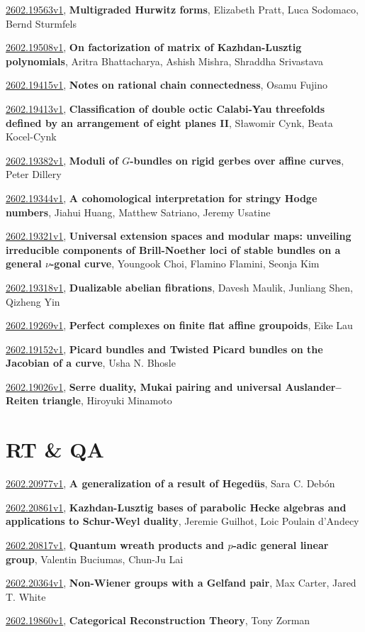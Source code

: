 \documentclass[9pt, a4paper]{article}
\theoremstyle{plain}
\theoremstyle{definition}
\theoremstyle{remark}
\newcommand{\arxiv}[3]{\href{https://arxiv.org/abs/#1}{#1}, \textbf{\textcolor{arxivblue}{#2}}, #3}
\begin{document}
\arxiv{2602.19563v1}{Multigraded Hurwitz forms}{Elizabeth Pratt, Luca Sodomaco, Bernd Sturmfels}

\arxiv{2602.19508v1}{On factorization of matrix of Kazhdan-Lusztig polynomials}{Aritra Bhattacharya, Ashish Mishra, Shraddha Srivastava}

\arxiv{2602.19415v1}{Notes on rational chain connectedness}{Osamu Fujino}

\arxiv{2602.19413v1}{Classification of double octic Calabi-Yau threefolds defined by an arrangement of eight planes II}{Sławomir Cynk, Beata Kocel-Cynk}

\arxiv{2602.19382v1}{Moduli of $G$-bundles on rigid gerbes over affine curves}{Peter Dillery}

\arxiv{2602.19344v1}{A cohomological interpretation for stringy Hodge numbers}{Jiahui Huang, Matthew Satriano, Jeremy Usatine}

\arxiv{2602.19321v1}{Universal extension spaces and modular maps: unveiling irreducible components of Brill-Noether loci of stable bundles on a general $ν$-gonal curve}{Youngook Choi, Flamino Flamini, Seonja Kim}

\arxiv{2602.19318v1}{Dualizable abelian fibrations}{Davesh Maulik, Junliang Shen, Qizheng Yin}

\arxiv{2602.19269v1}{Perfect complexes on finite flat affine groupoids}{Eike Lau}

\arxiv{2602.19152v1}{Picard bundles and Twisted Picard bundles on the Jacobian of a curve}{Usha N. Bhosle}

\arxiv{2602.19026v1}{Serre duality, Mukai pairing and universal Auslander--Reiten triangle}{Hiroyuki Minamoto}


\section{RT \& QA}
\arxiv{2602.20977v1}{A generalization of a result of Hegedüs}{Sara C. Debón}

\arxiv{2602.20861v1}{Kazhdan-Lusztig bases of parabolic Hecke algebras and applications to Schur-Weyl duality}{Jeremie Guilhot, Loic Poulain d'Andecy}

\arxiv{2602.20817v1}{Quantum wreath products and $p$-adic general linear group}{Valentin Buciumas, Chun-Ju Lai}

\arxiv{2602.20364v1}{Non-Wiener groups with a Gelfand pair}{Max Carter, Jared T. White}

\arxiv{2602.19860v1}{Categorical Reconstruction Theory}{Tony Zorman}
\end{document}
